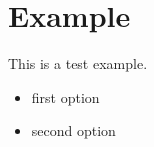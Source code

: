 \section{Example}

This is a test example.

\begin{itemize}
    \setlength\itemsep{0em}
    \item first option
    \item second option
\end{itemize}

\clearpage